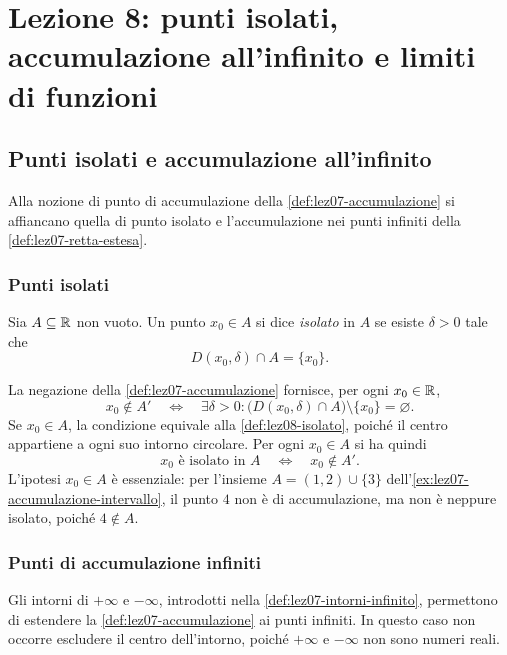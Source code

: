 \chapter[Lezione 8 --- 15 ottobre 2026]{Lezione 8: punti isolati, accumulazione all'infinito e limiti di funzioni}
\label{chap:lezione-08}

\section{Punti isolati e accumulazione all'infinito}
\label{sec:lez08-accumulazione-infinito}

Alla nozione di punto di accumulazione della
\cref{def:lez07-accumulazione} si affiancano quella di punto
isolato e l'accumulazione nei punti infiniti della
\cref{def:lez07-retta-estesa}.

\subsection{Punti isolati}
\label{sec:lez08-isolati}

\begin{definition}
\label{def:lez08-isolato}
Sia \(A\subseteq\mathbb{R}\) non vuoto. Un punto \(x_0\in A\)
si dice \emph{isolato} in \(A\) se esiste \(\delta>0\)
tale che
\[
  D(x_0,\delta)\cap A=\{x_0\}.
\]
\end{definition}

La negazione della \cref{def:lez07-accumulazione}
fornisce, per ogni \(x_0\in\mathbb{R}\),
\[
  x_0\notin A'
  \quad\Longleftrightarrow\quad
  \exists\delta>0:
  \bigl(D(x_0,\delta)\cap A\bigr)
  \setminus\{x_0\}=\varnothing.
\]
Se \(x_0\in A\), la condizione equivale alla
\cref{def:lez08-isolato}, poiché il centro appartiene
a ogni suo intorno circolare. Per ogni \(x_0\in A\) si ha quindi
\[
  x_0\text{ è isolato in }A
  \quad\Longleftrightarrow\quad
  x_0\notin A'.
\]
L'ipotesi \(x_0\in A\) è essenziale: per l'insieme
\(A=(1,2)\cup\{3\}\) dell'\cref{ex:lez07-accumulazione-intervallo},
il punto \(4\) non è di accumulazione, ma non è neppure
isolato, poiché \(4\notin A\).

\subsection{Punti di accumulazione infiniti}
\label{sec:lez08-accumulazione-estesa}

Gli intorni di \(+\infty\) e \(-\infty\), introdotti nella
\cref{def:lez07-intorni-infinito}, permettono di estendere
la \cref{def:lez07-accumulazione} ai punti infiniti. In questo
caso non occorre escludere il centro dell'intorno, poiché
\(+\infty\) e \(-\infty\) non sono numeri reali.

